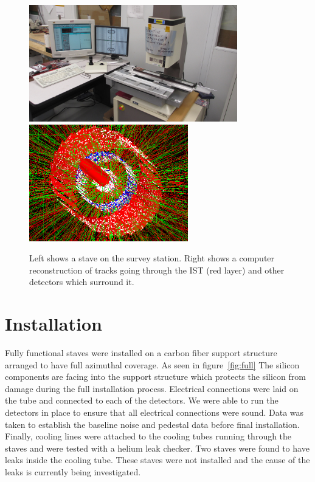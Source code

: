 \documentclass[preprint,12pt]{elsarticle}
\begin{document}
\begin{figure}
\begin{center}
\includegraphics[height=2in, keepaspectratio=true, angle=0]{graphics/survey.jpg}
\includegraphics[height=2in, keepaspectratio=true, angle=0]{graphics/event.png}
\caption{Left shows a stave on the survey station.  Right shows a computer
reconstruction of tracks going through the IST (red layer) and other detectors which
surround it.
\label{fig:survey}}
\end{center}
\end{figure}
%
\section{Installation}
Fully functional staves were installed on a carbon fiber support structure
arranged to have full azimuthal coverage. As seen in figure~\ref{fig:full} The silicon components are facing
into the support structure which protects the silicon from damage during the
full installation process. Electrical connections were laid on the tube and
connected to each of the detectors. We were able to run the detectors in place
to ensure that all electrical connections were sound. Data was taken to establish
the baseline noise and pedestal data before final installation. Finally, cooling
lines were attached to the cooling tubes running through the staves and were
tested with a helium leak checker. Two staves were found to have leaks inside
the cooling tube. These staves were not installed and the cause of the leaks is
currently being investigated.
\end{document}
